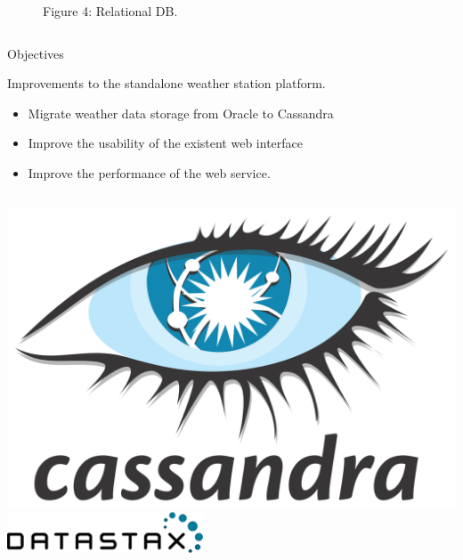 \documentclass[12pt]{beamer}
\begin{document}
\begin{frame}
\begin{columns}
\begin{center}
\begin{figure}[DB]
\captionsize\tiny Figure 4: Relational DB.
\label{DB}
\end{figure}
\end{center}
\end{columns}
\end{frame}

\begin{frame}{Objectives}
\begin{block}{Improvements to the standalone weather station platform.}
\begin{itemize}
\item Migrate weather data storage from Oracle to Cassandra
\item Improve the usability of the existent web interface
\item Improve the performance of the web service.
\end{itemize}
\end{block}
\begin{columns}
\includegraphics[scale=0.05]{Cassandra_logo.png} \label{Cassandra}
\includegraphics[scale=0.4]{DataStax_Logo.png} \label{DataStax}
\end{columns}
\end{frame}
\end{document}
